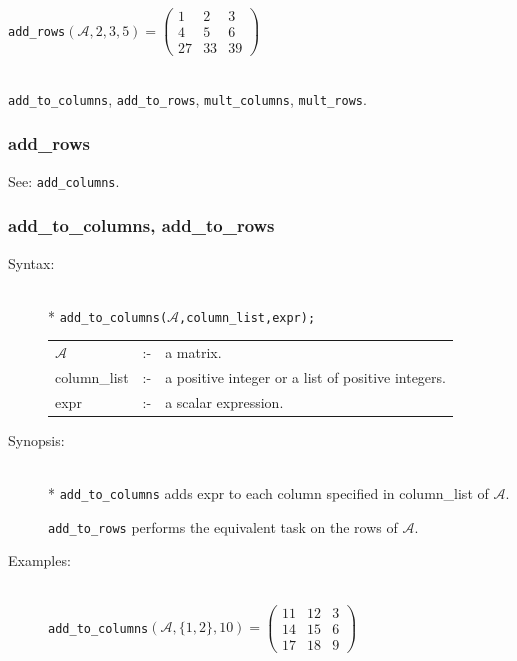 {\begin{description}
  \texttt{add\_rows}\((\mathcal{A},2,3,5)  =
  \begin{pmatrix} 1 & 2 & 3 \\ 4 & 5 & 6 \\ 27 & 33 & 39 \end{pmatrix}\)

\item[Related functions:]\mbox{}\\
\texttt{add\_to\_columns}, \texttt{add\_to\_rows},
\texttt{mult\_columns}, \texttt{mult\_rows}.
\end{description}

\subsubsection{add\_rows}
\label{linalg:add_rows}
\hypertarget{operator:ADD_ROWS}{}

See: \texttt{add\_columns}.


\subsubsection{add\_to\_columns, add\_to\_rows}
\label{linalg:add_to_columns}
\hypertarget{operator:ADD_TO_COLUMNS}{}

\begin{description}
  \item[Syntax:]\mbox{}\\*
{\tt add\_to\_columns($\mathcal{A}$,column\_list,expr);}\\[2mm]
\begin{tabular}{l l l}
$\mathcal{A}$   &:-& a matrix. \\
column\_list &:-& a positive integer or a list of positive integers. \\
expr        &:-& a scalar expression.
\end{tabular}

\item[Synopsis:]\mbox{}\\*
\texttt{add\_to\_columns} adds expr to each column specified in
column\_list of $\mathcal{A}$.

\texttt{add\_to\_rows} performs the equivalent task on the rows of
$\mathcal{A}$.

\item[Examples:]\mbox{}\\
  \texttt{add\_to\_columns}\((\mathcal{A},\{1,2\},10)  =
  \begin{pmatrix} 11 & 12 & 3 \\ 14 & 15 & 6 \\ 17 & 18 & 9 \end{pmatrix}\)


\end{description}}
